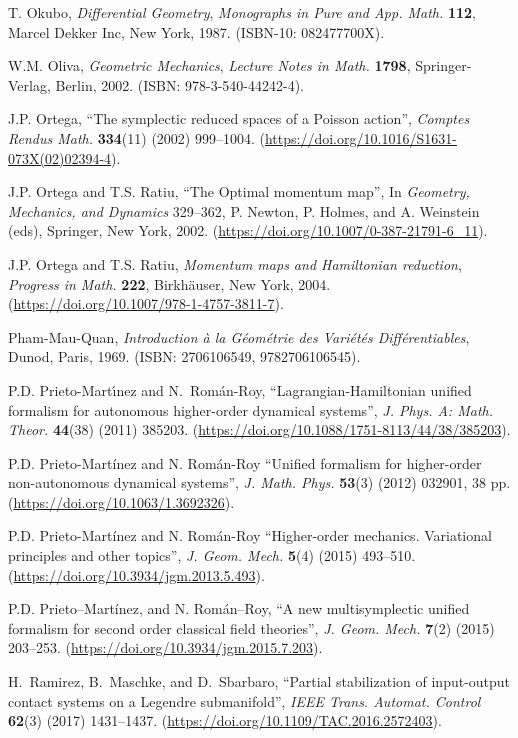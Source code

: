 \documentclass[12pt]{report}
\begin{document}
\begin{thebibliography}{999}
T. Okubo,
{\it Differential Geometry},
{\sl Monographs in Pure and App. Math.} {\bf 112}, 
Marcel Dekker Inc, New York, 1987.
(ISBN-10: 082477700X).

W.M. Oliva, 
{\it Geometric Mechanics},
{\sl Lecture Notes in Math.} {\bf 1798}, Springer-Verlag, Berlin, 2002.
(ISBN: 978-3-540-44242-4).

J.P. Ortega,
``The symplectic reduced spaces of a Poisson action'',
{\sl Comptes Rendus Math.}
{\bf 334}(11) (2002) 999--1004.
(\url{https://doi.org/10.1016/S1631-073X(02)02394-4}).

J.P. Ortega and T.S. Ratiu,
``The Optimal momentum map'',
In {\sl Geometry, Mechanics, and Dynamics} 329--362, P. Newton, P. Holmes, and A. Weinstein (eds), Springer, New York, 2002.
(\url{https://doi.org/10.1007/0-387-21791-6_11}).

J.P. Ortega and T.S. Ratiu,
{\it Momentum maps and Hamiltonian reduction},
{\sl Progress in Math.} {\bf 222}, Birkh\"auser, New York, 2004.
(\url{https://doi.org/10.1007/978-1-4757-3811-7}).

Pham-Mau-Quan,
{\it Introduction \`a la G\'eom\'etrie des Vari\'et\'es Diff\'erentiables}, Dunod, Paris, 1969.
(ISBN: 2706106549, 9782706106545).

P.D. {Prieto-Mart\'{\i}nez} and N.~{Rom\'{a}n-Roy},
  ``{Lagrangian}-{Hamiltonian} unified formalism for autonomous higher-order dynamical systems'', 
\textsl{J. Phys. A: Math. Theor.} \textbf{44}(38)  (2011) 385203.
(\url{https://doi.org/10.1088/1751-8113/44/38/385203}).

P.D. Prieto-Mart\'inez and N. Rom\'an-Roy
``Unified formalism for higher-order non-autonomous dynamical systems'',
{\sl J. Math. Phys.} {\bf 53}(3) (2012) 032901, 38 pp.
(\url{https://doi.org/10.1063/1.3692326}).

P.D. Prieto-Mart\'inez and N. Rom\'an-Roy
``Higher-order mechanics. Variational principles and other topics'',
{\sl J. Geom. Mech.} {\bf 5}(4) (2015) 493--510.
(\url{https://doi.org/10.3934/jgm.2013.5.493}).

P.D. Prieto--Mart\'inez, and N. Rom\'an--Roy,
``A new multisymplectic unified formalism for second order classical field theories'',
{\sl  J. Geom. Mech.} {\bf 7}(2) (2015) 203--253. 
(\url{https://doi.org/10.3934/jgm.2015.7.203}).

H.~Ramirez, B.~Maschke, and D.~Sbarbaro,
``Partial stabilization of input-output contact systems on a {L}egendre
  submanifold'',
{\sl IEEE Trans. Automat. Control} {\bf 62}(3) (2017) 1431--1437.
(\url{https://doi.org/10.1109/TAC.2016.2572403}).


\end{thebibliography}
\end{document}
